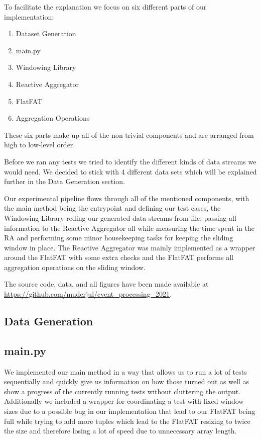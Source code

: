 To facilitate the explanation we focus on six different parts of our implementation:
\begin{enumerate}
  \item Dataset Generation
  \item main.py
  \item Windowing Library
  \item Reactive Aggregator
  \item FlatFAT
  \item Aggregation Operations
\end{enumerate}

These six parts make up all of the non-trivial components and are arranged from high
to low-level order.

Before we ran any tests we tried to identify the different kinds of data streams we
would need. We decided to stick with 4 different data sets which will be explained further
in the Data Generation section.

Our experimental pipeline flows through all of the mentioned components, with the main
method being the entrypoint and defining our test cases, the Windowing Library reding
our generated data streams from file, passing all information to the Reactive Aggregator
all while measuring the time spent in the RA and performing some minor housekeeping tasks
for keeping the sliding window in place.
The Reactive Aggregator was mainly implemented as a wrapper around the FlatFAT with some extra checks
and the FlatFAT performs all aggregation operations on the sliding window.

The source code, data, and all figures have been made available at \url{https://github.com/muderjul/event\_processing\_2021}.

\subsection{Data Generation}
\label{sec:dg}




\subsection{main.py}
We implemented our main method in a way that allows us to run a lot of tests sequentially
and quickly give us information on how those turned out as well as show a progress of the
currently running tests without cluttering the output.
Additionally we included a wrapper for coordinating a test with fixed window sizes due
to a possible bug in our implementation that lead to our FlatFAT being full while trying
to add more tuples which lead to the FlatFAT resizing to twice the size and therefore
losing a lot of speed due to unnecessary array length.

